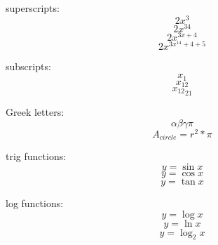 \documentclass[11]{article}
\begin{document}
superscripts: 
$$ 2x^3 $$ %
$$ 2x^{34} $$ %
$$ 2x^{ 3x + 4} $$
$$ 2x^{ 3x^{14} + 4 + 5} $$ %

subscripts: 
$$ x_1 $$
$$ x_{12} $$
$$ {x_{12}}_{21} $$ %

Greek letters: 
$$ \alpha \beta \gamma \pi $$ %
$$ A_{circle} = r^2 * \pi $$

trig functions: 
$$ y = \sin{x} $$
$$ y = \cos{x} $$
$$ y = \tan{x} $$

log functions: 
$$ y = \log{x} $$
$$ y = \ln{x} $$
$$ y = \log_2{x} $$ %
\end{document}
